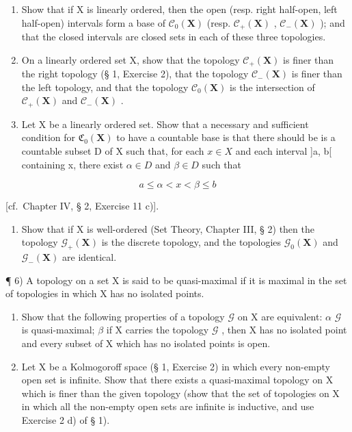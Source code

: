 \begin{enumerate}
\def\labelenumi{\alph{enumi})}
\item
  Show that if X is linearly ordered, then the open (resp. right half-open, left half-open) intervals form a base of \(\mathcal{C}_{0}(\mathbf{X})\) (resp. \(\mathcal{C}_{+}(\mathbf{X})\) , \(\mathcal{C}_{-}(\mathbf{X})\) ); and that the closed intervals are closed sets in each of these three topologies.
\item
  On a linearly ordered set X, show that the topology \(\mathcal{C}_{+}(\mathbf{X})\) is finer than the right topology (§ 1, Exercise 2), that the topology \(\mathcal{C}_{-}(\mathbf{X})\) is finer than the left topology, and that the topology \(\mathcal{C}_{0}(\mathbf{X})\) is the intersection of \(\mathcal{C}_{+}(\mathbf{X})\) and \(\mathcal{C}_{-}(\mathbf{X})\) .
\item
  Let X be a linearly ordered set. Show that a necessary and sufficient condition for \(\mathfrak{C}_{0}(\mathbf{X})\) to have a countable base is that there should be is a countable subset D of X such that, for each \(x \in X\) and each interval {]}a, b{[} containing x, there exist \(\alpha \in D\) and \(\beta \in D\) such that
\end{enumerate}

\[
a \leqslant \alpha <   x <   \beta \leqslant b
\]

{[}cf.~Chapter IV, § 2, Exercise 11 c){]}.

\begin{enumerate}
\def\labelenumi{\alph{enumi})}
\setcounter{enumi}{3}
\tightlist
\item
  Show that if X is well-ordered (Set Theory, Chapter III, § 2) then the topology \(\mathcal{G}_{+}(\mathbf{X})\) is the discrete topology, and the topologies \(\mathcal{G}_{0}(\mathbf{X})\) and \(\mathcal{G}_{-}(\mathbf{X})\) are identical.
\end{enumerate}

¶ 6) A topology on a set X is said to be quasi-maximal if it is maximal in the set of topologies in which X has no isolated points.

\begin{enumerate}
\def\labelenumi{\alph{enumi})}
\item
  Show that the following properties of a topology \(\mathcal{G}\) on X are equivalent: \(\alpha\) \(\mathcal{G}\) is quasi-maximal; \(\beta\) if X carries the topology \(\mathcal{G}\) , then X has no isolated point and every subset of X which has no isolated points is open.
\item
  Let X be a Kolmogoroff space (§ 1, Exercise 2) in which every non-empty open set is infinite. Show that there exists a quasi-maximal topology on X which is finer than the given topology (show that the set of topologies on X in which all the non-empty open sets are infinite is inductive, and use Exercise 2 d) of § 1).
\end{enumerate}

